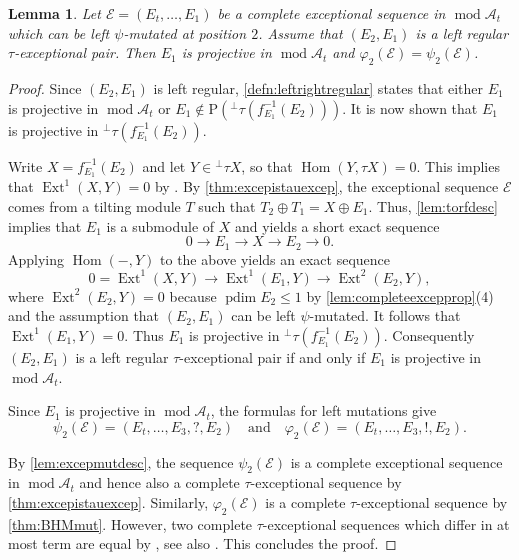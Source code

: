 \documentclass[10pt,twoside, a4paper,reqno]{amsart}
\DeclareMathOperator{\mods}{mod}
\DeclareMathOperator{\Ext}{Ext}
\DeclareMathOperator{\Hom}{Hom}
\DeclareMathOperator{\projdim}{pdim}
\newcommand{\A}{\mathscr{A}}
\newcommand{\Ecal}{\mathcal{E}}
\newcommand{\Prm}{\mathrm{P}}
\newtheorem{lemma}[theorem]{Lemma}
\theoremstyle{definition}
\begin{document}
\begin{lemma}\label{lem:leftregmut}
    Let $\Ecal= (E_t, \dots, E_1)$ be a complete exceptional sequence in $\mods \A_t$ which can be left $\psi$-mutated at position $2$. Assume that $(E_2, E_1)$ is a left regular $\tau$-exceptional pair. Then $E_1$ is projective in $\mods \A_t$ and $\varphi_{2}(\Ecal) = \psi_{2}(\Ecal)$.
\end{lemma}
\begin{proof}
    Since $(E_2, E_1)$ is left regular, \cref{defn:leftrightregular} states that either $E_1$ is projective in $\mods \A_t$ or $E_1 \not \in \Prm({}^\perp \tau (f_{E_1}^{-1}(E_2)))$. It is now shown that $E_1$ is projective in ${}^\perp \tau (f_{E_1}^{-1}(E_2))$.

    Write $X= f_{E_1}^{-1}(E_2)$ and let $Y \in {}^\perp \tau X$, so that $\Hom(Y, \tau X)=0$. This implies that $\Ext^1(X,Y) = 0$ by \cite[Cor. IV.4.7]{ARS1995}. By \cref{thm:excepistauexcep}, the exceptional sequence $\Ecal$ comes from a tilting module $T$ such that $T_2 \oplus T_1 = X \oplus E_1$. Thus, \cref{lem:torfdesc} implies that $E_1$ is a submodule of $X$ and yields a short exact sequence 
    \[ 0 \to E_1 \to X \to E_2 \to 0. \]
    Applying $\Hom(-,Y)$ to the above yields an exact sequence
    \[ 0 = \Ext^1(X,Y) \to \Ext^1(E_1,Y) \to \Ext^2(E_2, Y),\]
    where $\Ext^2(E_2, Y) = 0$ because $\projdim E_2 \leq 1$ by \cref{lem:completeexcepprop}(4) and the assumption that $(E_2, E_1)$ can be left $\psi$-mutated. It follows that $\Ext^1(E_1, Y) = 0$. Thus $E_1$ is projective in ${}^\perp \tau (f_{E_1}^{-1}(E_2))$. Consequently $(E_2, E_1)$ is a left regular $\tau$-exceptional pair if and only if $E_1$ is projective in $\mods \A_t$.

    Since $E_1$ is projective in $\mods \A_t$, the formulas for left mutations give
    \[ \psi_{2}(\Ecal) = (E_t, \dots, E_3, ?, E_2) \quad \text{and} \quad \varphi_{2}(\Ecal) = (E_t, \dots, E_3, !,E_2).\]

    By \cref{lem:excepmutdesc}, the sequence $\psi_{2}(\Ecal)$ is a complete exceptional sequence in $\mods \A_t$ and hence also a complete $\tau$-exceptional sequence by \cref{thm:excepistauexcep}. Similarly, $\varphi_{2}(\Ecal)$ is a complete $\tau$-exceptional sequence by \cref{thm:BHMmut}. However, two complete $\tau$-exceptional sequences which differ in at most term are equal by \cite[Thm. 2.1(a)]{BuanMarsh2023}, see also \cite[Thm. 8]{HansonThomas2024}. This concludes the proof.
\end{proof}
\end{document}
